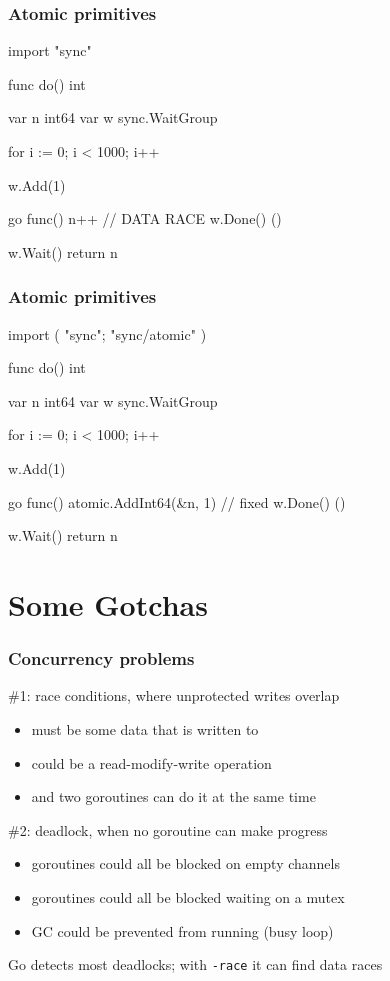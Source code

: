 \documentclass[handout,compress,t,11pt]{beamer}
\begin{document}
\begin{frame}[fragile]
    \frametitle{Atomic primitives}
\begin{golang}
import "sync"

func do() int {
    var n int64
    var w sync.WaitGroup

    for i := 0; i < 1000; i++ {
        w.Add(1)

        go func() {
			n++                         // DATA RACE
            w.Done()
        }()
    }
    
    w.Wait()
    return n
}
\end{golang}
\end{frame}

\begin{frame}[fragile]
    \frametitle{Atomic primitives}
\begin{golang}
import ( "sync"; "sync/atomic" )

func do() int {
    var n int64
    var w sync.WaitGroup

    for i := 0; i < 1000; i++ {
        w.Add(1)

        go func() {
			atomic.AddInt64(&n, 1)      // fixed
            w.Done()
        }()
    }
    
    w.Wait()
    return n
}
\end{golang}
\end{frame}


\section{Some Gotchas}
\begin{frame}[fragile]
    \frametitle{Concurrency problems}
    \#1: race conditions, where unprotected writes overlap \par
    \begin{itemize}
        \item must be some data that is written to
        \item could be a read-modify-write operation
        \item and two goroutines can do it at the same time
    \end{itemize}
    \vspace{\baselineskip}
    \#2: deadlock, when no goroutine can make progress \par
    \begin{itemize}
        \item goroutines could all be blocked on empty channels
        \item goroutines could all be blocked waiting on a mutex
        \item GC could be prevented from running (busy loop)
    \end{itemize}
\vspace{\baselineskip}
Go detects most deadlocks; with \verb|-race| it can find data races
\end{frame}
\end{document}
